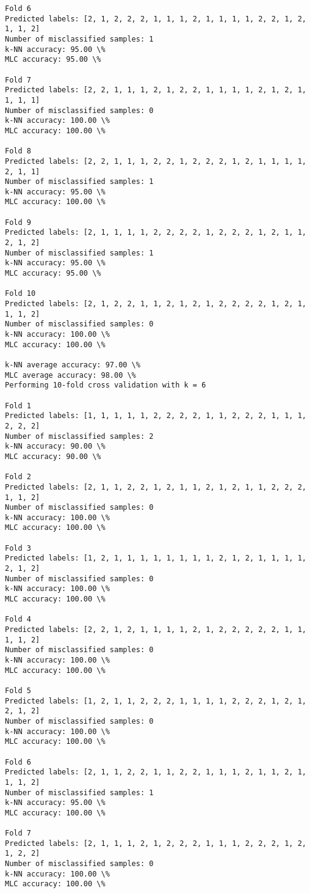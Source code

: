 \documentclass[11pt]{article}
\begin{document}
\begin{Verbatim}[commandchars=\\\{\}]
Fold 6
Predicted labels: [2, 1, 2, 2, 2, 1, 1, 1, 2, 1, 1, 1, 1, 2, 2, 1, 2, 1, 1, 2]
Number of misclassified samples: 1
k-NN accuracy: 95.00 \%
MLC accuracy: 95.00 \%

Fold 7
Predicted labels: [2, 2, 1, 1, 1, 2, 1, 2, 2, 1, 1, 1, 1, 2, 1, 2, 1, 1, 1, 1]
Number of misclassified samples: 0
k-NN accuracy: 100.00 \%
MLC accuracy: 100.00 \%

Fold 8
Predicted labels: [2, 2, 1, 1, 1, 2, 2, 1, 2, 2, 2, 1, 2, 1, 1, 1, 1, 2, 1, 1]
Number of misclassified samples: 1
k-NN accuracy: 95.00 \%
MLC accuracy: 100.00 \%

Fold 9
Predicted labels: [2, 1, 1, 1, 1, 2, 2, 2, 2, 1, 2, 2, 2, 1, 2, 1, 1, 2, 1, 2]
Number of misclassified samples: 1
k-NN accuracy: 95.00 \%
MLC accuracy: 95.00 \%

Fold 10
Predicted labels: [2, 1, 2, 2, 1, 1, 2, 1, 2, 1, 2, 2, 2, 2, 1, 2, 1, 1, 1, 2]
Number of misclassified samples: 0
k-NN accuracy: 100.00 \%
MLC accuracy: 100.00 \%

k-NN average accuracy: 97.00 \%
MLC average accuracy: 98.00 \%
Performing 10-fold cross validation with k = 6

Fold 1
Predicted labels: [1, 1, 1, 1, 1, 2, 2, 2, 2, 1, 1, 2, 2, 2, 1, 1, 1, 2, 2, 2]
Number of misclassified samples: 2
k-NN accuracy: 90.00 \%
MLC accuracy: 90.00 \%

Fold 2
Predicted labels: [2, 1, 1, 2, 2, 1, 2, 1, 1, 2, 1, 2, 1, 1, 2, 2, 2, 1, 1, 2]
Number of misclassified samples: 0
k-NN accuracy: 100.00 \%
MLC accuracy: 100.00 \%

Fold 3
Predicted labels: [1, 2, 1, 1, 1, 1, 1, 1, 1, 1, 2, 1, 2, 1, 1, 1, 1, 2, 1, 2]
Number of misclassified samples: 0
k-NN accuracy: 100.00 \%
MLC accuracy: 100.00 \%

Fold 4
Predicted labels: [2, 2, 1, 2, 1, 1, 1, 1, 2, 1, 2, 2, 2, 2, 2, 1, 1, 1, 1, 2]
Number of misclassified samples: 0
k-NN accuracy: 100.00 \%
MLC accuracy: 100.00 \%

Fold 5
Predicted labels: [1, 2, 1, 1, 2, 2, 2, 1, 1, 1, 1, 2, 2, 2, 1, 2, 1, 2, 1, 2]
Number of misclassified samples: 0
k-NN accuracy: 100.00 \%
MLC accuracy: 100.00 \%

Fold 6
Predicted labels: [2, 1, 1, 2, 2, 1, 1, 2, 2, 1, 1, 1, 2, 1, 1, 2, 1, 1, 1, 2]
Number of misclassified samples: 1
k-NN accuracy: 95.00 \%
MLC accuracy: 100.00 \%

Fold 7
Predicted labels: [2, 1, 1, 1, 2, 1, 2, 2, 2, 1, 1, 1, 2, 2, 2, 1, 2, 1, 2, 2]
Number of misclassified samples: 0
k-NN accuracy: 100.00 \%
MLC accuracy: 100.00 \%


\end{Verbatim}
\end{document}
